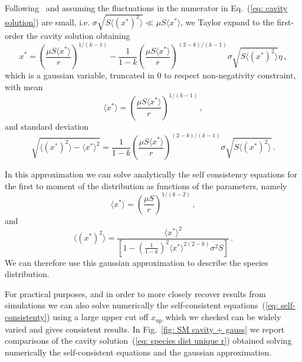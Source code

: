 \documentclass[10pt]{article}
\begin{document}
Following~\cite{Cui2020} and assuming the fluctuations in the numerator in Eq.~(\ref{eq: cavity solution})
are small, i.e. $\sigma \sqrt{S\langle (x^*)^2\rangle}\ll \mu S \langle x^* \rangle$,
we Taylor expand to the first-order the cavity solution obtaining
\begin{equation}
    x^* = \left(\frac{ \mu S \langle x^* \rangle}{r}\right)^{1/(k-1)} -
    \frac{1}{1-k}\left(\frac{ \mu S \langle x^* \rangle}{r}\right)^{(2-k)/(k-1)}\sigma \sqrt{S\langle (x^*)^2\rangle}\eta \, ,
\end{equation}
which is a gaussian variable, truncated in 0 to respect
non-negativity constraint, with mean
\begin{equation}
    \langle x^* \rangle = \left(\frac{ \mu S \langle x^* \rangle}{r}\right)^{1/(k-1)} \, ,
\end{equation}
and standard deviation
\begin{equation}
    \sqrt{\langle (x^*)^2 \rangle - \langle x^* \rangle^2} =
    \frac{1}{1-k}\left(\frac{ \mu S \langle x^* \rangle}{r}\right)^{(2-k)/(k-1)}\sigma \sqrt{S\langle (x^*)^2\rangle} \, .
\end{equation}

In this approximation we can solve analytically 
the self consistency equations for the first to moment of the
distribution as functions of the parameters, namely 
\begin{equation}
    \langle x^* \rangle = \left(\frac{ \mu S}{r}\right)^{1/(k-2)} \, ,
    \label{eq: SM first moment}
\end{equation}
and
\begin{equation}
    \langle (x^*)^2 \rangle = \frac{ \langle x^* \rangle^2}
    {\left[1-\left(\frac{1}{1-k}\right)^2\langle x^* \rangle^{2(2-k)}
    \sigma^2S\right]} \, .
    \label{eq: SM second moment}
\end{equation}
We can therefore use this gaussian approximation to describe the
species distribution.

For practical purposes, and in order to more closely recover
results from simulations we can also solve numerically the self-consistent
equations~(\ref{eq: self-consistenty}) using a large
upper cut off $x_{\textrm{up}}$ which we checked can be widely varied
and gives consistent results.
In Fig.~\ref{fig: SM cavity + gauss} we report comparisons
of the cavity solution~(\ref{eq: species dist unique r}) 
obtained solving numerically the self-consistent equations
and the gaussian approximation.
\end{document}
